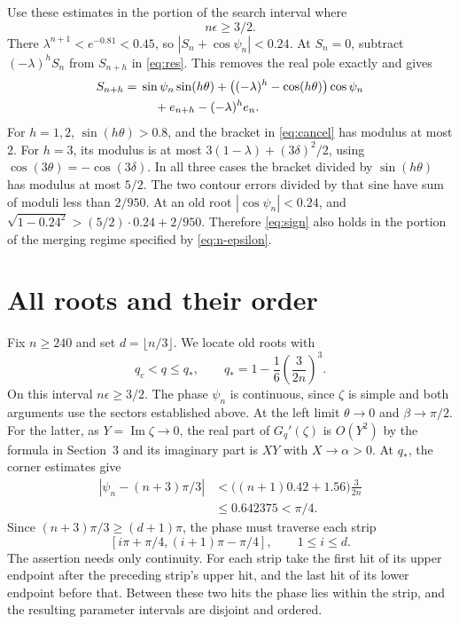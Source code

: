 \documentclass[11pt]{article}
\newcommand{\Imag}{\operatorname{Im}}
\begin{document}
Use these estimates in the portion of the search interval where
\begin{equation}\label{eq:n-epsilon}
 n\epsilon\ge3/2.
\end{equation}
There \(\lambda^{n+1}<e^{-0.81}<0.45\), so
\(|S_n+\cos\psi_n|<0.24\). At \(S_n=0\), subtract
\((-\lambda)^h S_n\) from \(S_{n+h}\) in \eqref{eq:res}. This removes
the real pole exactly and gives
\begin{equation}\label{eq:cancel}
 \begin{split}
 S_{n+h}={}&\sin\psi_n\sin(h\theta)
   +\bigl((-\lambda)^h-\cos(h\theta)\bigr)\cos\psi_n\\
 &\hspace{4mm}+e_{n+h}-(-\lambda)^he_n .
 \end{split}
\end{equation}
For \(h=1,2\), \(\sin(h\theta)>0.8\), and the bracket in
\eqref{eq:cancel} has modulus at most \(2\).
For \(h=3\), its modulus is at most
\(3(1-\lambda)+(3\delta)^2/2\), using
\(\cos(3\theta)=-\cos(3\delta)\). In all three cases the
bracket divided by \(\sin(h\theta)\) has modulus at most \(5/2\).
The two contour errors divided by that sine have sum of
moduli less than \(2/950\).
At an old root \(|\cos\psi_n|<0.24\), and
\(\sqrt{1-0.24^2}>(5/2)\cdot0.24+2/950\).
Therefore \eqref{eq:sign} also holds in the portion of the
merging regime specified by \eqref{eq:n-epsilon}.

\section{All roots and their order}

Fix \(n\ge240\) and set \(d=\lfloor n/3\rfloor\). We locate old
roots with
\[
 q_c<q\le q_*,
 \qquad q_*=1-\frac{1}{6}\left(\frac{3}{2n}\right)^3.
\]
On this interval \(n\epsilon\ge3/2\). The phase \(\psi_n\) is
continuous, since \(\zeta\) is simple and both arguments use the
sectors established above. At the left limit \(\theta\to0\) and
\(\beta\to\pi/2\). For the latter, as \(Y=\Imag\zeta\to0\),
the real part of \(G_q'(\zeta)\) is \(O(Y^2)\) by the formula
in Section~3 and its imaginary part is \(XY\) with \(X\to\alpha>0\).
At \(q_*\), the corner estimates give
\begin{align*}
 \left|\psi_n-(n+3)\pi/3\right|
 &<\bigl((n+1)0.42+1.56\bigr)\frac{3}{2n}\\
 &\le 0.642375<\pi/4 .
\end{align*}
Since \((n+3)\pi/3\ge(d+1)\pi\), the phase must traverse each strip
\[
 [i\pi+\pi/4,(i+1)\pi-\pi/4],\qquad 1\le i\le d.
\]
The assertion needs only continuity. For each strip take the first
hit of its upper endpoint after the preceding strip's upper hit,
and the last hit of its lower endpoint before that. Between these
two hits the phase lies within the strip, and the resulting
parameter intervals are disjoint and ordered.
\end{document}
